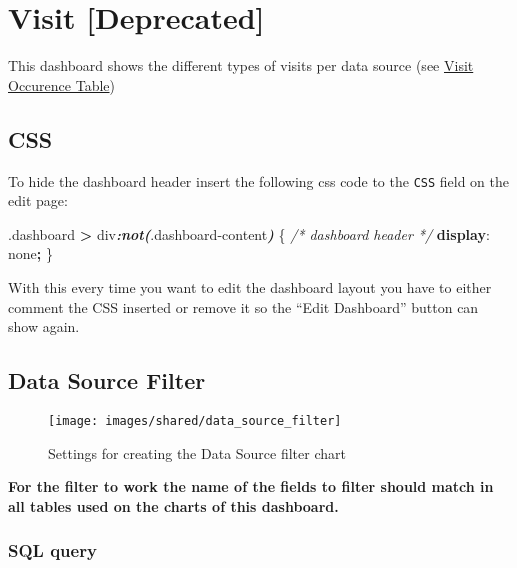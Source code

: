 \documentclass[
]{book}
\newenvironment{Shaded}{\begin{snugshade}}{\end{snugshade}}
\newcommand{\CommentTok}[1]{\textcolor[rgb]{0.56,0.35,0.01}{\textit{#1}}}
\newcommand{\DecValTok}[1]{\textcolor[rgb]{0.00,0.00,0.81}{#1}}
\newcommand{\FunctionTok}[1]{\textcolor[rgb]{0.00,0.00,0.00}{#1}}
\newcommand{\InformationTok}[1]{\textcolor[rgb]{0.56,0.35,0.01}{\textbf{\textit{#1}}}}
\newcommand{\KeywordTok}[1]{\textcolor[rgb]{0.13,0.29,0.53}{\textbf{#1}}}
\newcommand{\NormalTok}[1]{#1}
\newcommand{\OperatorTok}[1]{\textcolor[rgb]{0.81,0.36,0.00}{\textbf{#1}}}
\begin{document}
\hypertarget{visit-deprecated}{%
\section{Visit {[}Deprecated{]}}\label{visit-deprecated}}

This dashboard shows the different types of visits per data source (see \href{https://ohdsi.github.io/CommonDataModel/cdm531.html\#visit_occurrence}{Visit Occurence Table})

\hypertarget{css-5}{%
\subsection*{CSS}\label{css-5}}

To hide the dashboard header insert the following css code to the \texttt{CSS} field on the edit page:

\begin{Shaded}
\begin{Highlighting}[]
\FunctionTok{.dashboard} \OperatorTok{\textgreater{}}\NormalTok{ div}\InformationTok{:not(}\FunctionTok{.dashboard{-}content}\InformationTok{)}\NormalTok{ \{  }\CommentTok{/* dashboard header */}
  \KeywordTok{display}\NormalTok{: }\DecValTok{none}\OperatorTok{;}
\NormalTok{\}}
\end{Highlighting}
\end{Shaded}

With this every time you want to edit the dashboard layout you have to either comment the CSS inserted
or remove it so the ``Edit Dashboard'' button can show again.

\hypertarget{data-source-filter-3}{%
\subsection*{Data Source Filter}\label{data-source-filter-3}}

\begin{figure}
\texttt{[image: images/shared/data\_source\_filter]} \caption{Settings for creating the Data Source filter chart}\label{fig:dataSourceFilter}
\end{figure}

\textbf{For the filter to work the name of the fields to filter should match in all tables used on the charts of this dashboard.}

\hypertarget{sql-query-23}{%
\subsubsection*{SQL query}\label{sql-query-23}}
\end{document}
